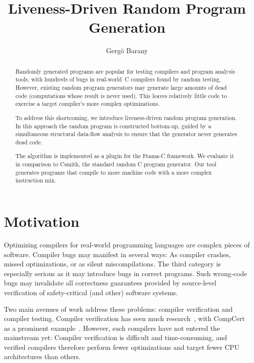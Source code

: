\documentclass{llncs}
\title{Liveness-Driven Random Program Generation}
\author{Gergö Barany}
\institute{Inria Paris, France \\
           \email{gergo.barany@inria.fr}}
\begin{document}
\maketitle
\pagestyle{plain}  %

\begin{abstract}
Randomly generated programs are popular for testing compilers and program
analysis tools, with hundreds of bugs in real-world~C compilers found by
random testing. However, existing random program generators may generate
large amounts of dead code (computations whose result is never used). This
leaves relatively little code to exercise a target compiler's more complex
optimizations.

To address this shortcoming, we introduce liveness-driven random program
generation. In this approach the random program is constructed bottom-up,
guided by a simultaneous structural data-flow analysis to ensure that the
generator never generates dead code.

The algorithm is implemented as a plugin for the Frama-C framework. We
evaluate it in comparison to Csmith, the standard random C program
generator. Our tool generates programs that compile to more machine code
with a more complex instruction mix.
\end{abstract}



\section{Motivation}

Optimizing compilers for real-world programming languages are complex pieces
of software. Compiler bugs may manifest in several ways: As compiler
crashes, missed optimizations, or as silent miscompilations. The third
category is especially serious as it may introduce bugs in correct programs.
Such wrong-code bugs may invalidate all correctness guarantees provided by
source-level verification of safety-critical (and other) software systems.

Two main avenues of work address these problems: compiler verification and
compiler testing. Compiler verification has seen much
research~\cite{dave-2003}, with Comp\-Cert as a prominent
example~\cite{leroy-2009}. However, such compilers have not entered the
mainstream yet: Compiler verification is difficult and time-consuming, and
verified compilers therefore perform fewer optimizations and target fewer
CPU architectures than others.
\end{document}
